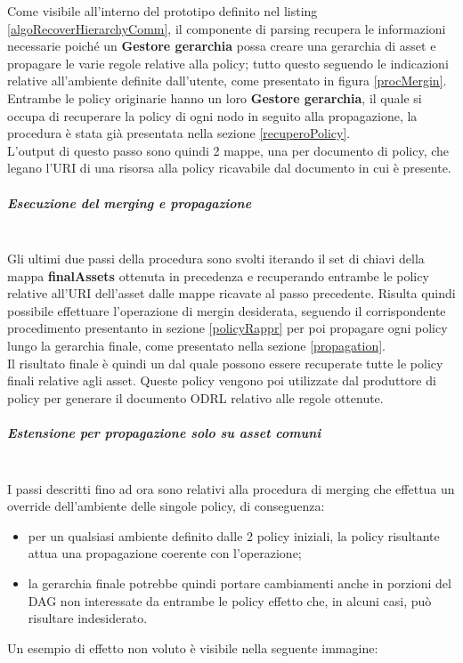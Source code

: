 \documentclass[12pt,a4paper,twoside]{book}
\begin{document}
Come visibile all'interno del prototipo definito nel listing \ref{algoRecoverHierarchyComm}, il componente di parsing recupera le informazioni necessarie poiché un \textbf{Gestore gerarchia} possa creare una gerarchia di asset e propagare le varie regole relative alla policy; tutto questo seguendo le indicazioni relative all'ambiente definite dall'utente, come presentato in figura \ref{procMergin}.\\
Entrambe le policy originarie hanno un loro \textbf{Gestore gerarchia}, il quale si occupa di recuperare la policy di ogni nodo in seguito alla propagazione, la procedura è stata già presentata nella sezione \ref{recuperoPolicy}.\\
L'output di questo passo sono quindi 2 mappe, una per documento di policy, che legano l'URI di una risorsa alla policy ricavabile dal documento in cui è presente. 
\subparagraph{Esecuzione del merging e propagazione}\mbox{}\\
Gli ultimi due passi della procedura sono svolti iterando il set di chiavi della mappa \textbf{finalAssets} ottenuta in precedenza e recuperando entrambe le policy relative all'URI dell'asset dalle mappe ricavate al passo precedente. Risulta quindi possibile effettuare l'operazione di mergin desiderata, seguendo il corrispondente procedimento presentanto in sezione \ref{policyRappr} per poi propagare ogni policy lungo la gerarchia finale, come presentato nella sezione \ref{propagation}.\\
Il risultato finale è quindi un  dal quale possono essere recuperate tutte le policy finali relative agli asset. Queste policy vengono poi utilizzate dal produttore di policy per generare il documento ODRL relativo alle regole ottenute.
\subparagraph{Estensione per propagazione solo su asset comuni}\mbox{}\\ \label{estensioneAlg}
I passi descritti fino ad ora sono relativi alla procedura di merging che effettua un override dell'ambiente delle singole policy, di conseguenza:
\begin{itemize}
\item per un qualsiasi ambiente definito dalle 2 policy iniziali, la policy risultante attua una propagazione coerente con l'operazione;
\item la gerarchia finale potrebbe quindi portare cambiamenti anche in porzioni del DAG non interessate da entrambe le policy effetto che, in alcuni casi, può risultare indesiderato.
\end{itemize}
Un esempio di effetto non voluto è visibile nella seguente immagine:
\end{document}
